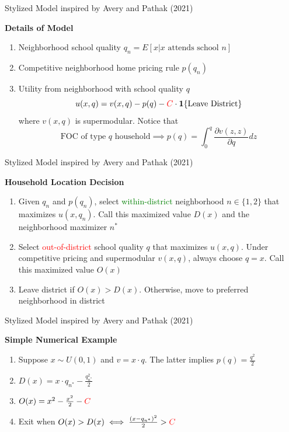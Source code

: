\documentclass[notes,11pt, aspectratio=169]{beamer}
\newenvironment{wideitemize}{\itemize\addtolength{\itemsep}{10pt}}{\enditemize}
\begin{document}
\begin{frame}{Stylized Model inspired by Avery and Pathak (2021)}
\label{details}
\begin{wideitemize}
\item \textbf{Details of Model}
\begin{enumerate}
\item Neighborhood school quality $q_n = E[x|x \text{ attends school }n]$
\item Competitive neighborhood home pricing rule $p(q_n)$
\item Utility from neighborhood with school quality $q$ 
\begin{equation*} u(x,q) = v(x,q) - p(q) - \textcolor{red}{C}\cdot \mathbf{1}\{ \text{Leave District}\}
\end{equation*} where $v(x,q)$ is supermodular. Notice that
\[\text{FOC of type $q$ household} \implies p(q) = \int_0^q \frac{\partial v(z,z)}{\partial q}dz\]
\end{enumerate}
\end{wideitemize}
\hyperlink{detailsback}{}
\end{frame}

\begin{frame}{Stylized Model inspired by Avery and Pathak (2021)}
\label{location}
\begin{wideitemize}
\item \textbf{Household Location Decision}
\begin{enumerate}
\item Given $q_n$ and $p(q_n)$, select \textcolor{green}{within-district} neighborhood $n \in \{1,2\}$ that maximizes $u(x,q_n)$. Call this maximized value $D(x)$ and the neighborhood maximizer $n^*$
\item Select \textcolor{red}{out-of-district} school quality $q$ that maximizes $u(x,q)$. Under competitive pricing and supermodular $v(x,q)$, always choose $q=x$. Call this maximized value $O(x)$
\item Leave district if $O(x) > D(x)$. Otherwise, move to preferred neighborhood in district
\end{enumerate}
\end{wideitemize}
\hyperlink{detailsback}{}
\end{frame}

\begin{frame}{Stylized Model inspired by Avery and Pathak (2021)}
\label{example}
\begin{wideitemize}
\item \textbf{Simple Numerical Example}
\begin{enumerate}
\item Suppose $x \sim U(0,1)$ and $v = x \cdot q$. The latter implies $p(q) = \frac{q^2}{2}$
\item $D(x) = x \cdot q_{n^*} - \frac{q_{n^*}^2}{2}$
\item $O(x) = x^2 - \frac{x^2}{2} - \textcolor{red}{C}$
\item Exit when $O(x) > D(x) \iff \frac{(x-q_{n^*})^2}{2} > \textcolor{red}{C} $
\end{enumerate}
\end{wideitemize}
\hyperlink{detailsback}{}
\end{frame}
\end{document}
